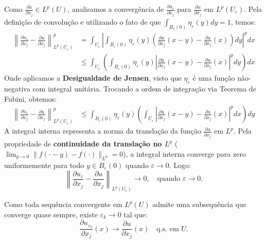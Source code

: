 \documentclass[cs_edp_2026.1.tex]{subfiles} %
\begin{document}
\begin{prova}
	Como $\frac{\partial u}{\partial x_j} \in L^p(U)$, analisamos a convergência de $\frac{\partial u_\varepsilon}{\partial x_j}$ para $\frac{\partial u}{\partial x_j}$ em $L^p(U_\varepsilon)$. Pela definição de convolução e utilizando o fato de que $\int_{B_\varepsilon(0)} \eta_\varepsilon(y) dy = 1$, temos:
	\begin{align*}
		\left\| \frac{\partial u_\varepsilon}{\partial x_j} - \frac{\partial u}{\partial x_j} \right\|_{L^p(U_\varepsilon)}^p &= \int_{U_\varepsilon} \left| \int_{B_\varepsilon(0)} \eta_\varepsilon(y) \left( \frac{\partial u}{\partial x_j}(x-y) - \frac{\partial u}{\partial x_j}(x) \right) dy \right|^p dx \\
		&\le \int_{U_\varepsilon} \left( \int_{B_\varepsilon(0)} \eta_\varepsilon(y) \left| \frac{\partial u}{\partial x_j}(x-y) - \frac{\partial u}{\partial x_j}(x) \right|^p dy \right) dx
	\end{align*}
	Onde aplicamos a \textbf{Desigualdade de Jensen}, visto que $\eta_\varepsilon$ é uma função não-negativa com integral unitária. Trocando a ordem de integração via Teorema de Fubini, obtemos:
	\begin{align*}
		\left\| \frac{\partial u_\varepsilon}{\partial x_j} - \frac{\partial u}{\partial x_j} \right\|_{L^p(U_\varepsilon)}^p &\le \int_{B_\varepsilon(0)} \eta_\varepsilon(y) \left( \int_{U_\varepsilon} \left| \frac{\partial u}{\partial x_j}(x-y) - \frac{\partial u}{\partial x_j}(x) \right|^p dx \right) dy
	\end{align*}
	A integral interna representa a norma da translação da função $\frac{\partial u}{\partial x_j}$ em $L^p$. Pela propriedade de \textbf{continuidade da translação no $L^p$} ($\lim_{y \to 0} \| f(\cdot - y) - f(\cdot) \|_{L^p} = 0$), a integral interna converge para zero uniformemente para todo $y \in B_\varepsilon(0)$ quando $\varepsilon \to 0$. Logo:
	$$\left\| \frac{\partial u_\varepsilon}{\partial x_j} - \frac{\partial u}{\partial x_j} \right\|_{L^p(U_\varepsilon)} \to 0, \quad \text{quando } \varepsilon \to 0.$$
	
	Como toda sequência convergente em $L^p(U)$ admite uma subsequência que converge quase sempre, existe $\varepsilon_k \to 0$ tal que:
	$$\frac{\partial u_{\varepsilon_k}}{\partial x_j}(x) \to \frac{\partial u}{\partial x_j}(x) \quad \text{q.s. em } U.$$
	

\end{prova}
\end{document}
